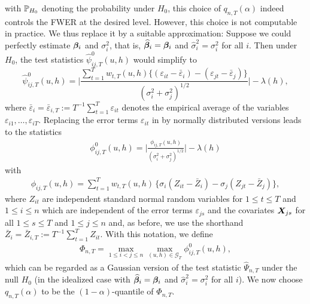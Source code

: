 \documentclass[a4paper,12pt]{article}
\makeatletter
\renewcommand{\eqref}[1]{\tagform@{\ref{#1}}}
\makeatother
\begin{document}
with $\mathbb{P}_{H_0}$ denoting the probability under $H_0$, this choice of $q_{n,T}(\alpha)$ indeed controls the FWER at the desired level. However, this choice is not computable in practice. We thus replace it by a suitable approximation: Suppose we could perfectly estimate $\bm{\beta}_i$ and $\sigma_i^2$, that is, $\widehat{\bm{\beta}}_i = \bm{\beta}_i$ and $\widehat{\sigma}_i^2 = \sigma_i^2$ for all $i$. Then under $H_0$, the test statistics $\widehat{\psi}^0_{ij, T}(u, h)$ would simplify to 
\begin{equation}\label{eq:stat-idealized}
\widehat{\psi}^0_{ij, T}(u, h) = \Big| \frac{\sum\nolimits_{t=1}^T w_{t,T}(u, h) \{ (\varepsilon_{it} - \bar{\varepsilon}_i) - (\varepsilon_{jt} - \bar{\varepsilon}_j) \}}{(\sigma_i^2 + \sigma_j^2)^{1/2}} \Big| - \lambda(h), 
\end{equation}
where $\bar{\varepsilon}_i = \bar{\varepsilon}_{i,T} := T^{-1} \sum_{t=1}^T \varepsilon_{it}$ denotes the empirical average of the variables $\varepsilon_{i1},\ldots,\varepsilon_{iT}$. Replacing the error terms $\varepsilon_{it}$ in \eqref{eq:stat-idealized} by normally distributed versions leads to the statistics
\begin{align}\label{eq:phi_zero_ij}
\phi^0_{ij, T}(u, h) =  \bigg|\frac{\phi_{ij, T}(u, h)}{(\sigma_i^2 + \sigma_j^2)^{1/2}}\bigg| - \lambda(h)
\end{align}
with 
\begin{align}\label{eq:phi_ij}
\phi_{ij, T}(u, h) = \sum\limits_{t=1}^T w_{t,T}(u, h) \, \big\{ \sigma_i (Z_{it} - \bar{Z}_i) - \sigma_j (Z_{jt} - \bar{Z}_j) \big\},
\end{align}
where $Z_{it}$ are independent standard normal random variables for $1 \le t \le T$ and $1 \le i \le n$ which are independent of the error terms $\varepsilon_{js}$ and the covariates $\boldsymbol{X}_{js}$ for all $1 \leq s \leq T $ and $1 \leq j \leq n$ and, as before, we use the shorthand $\bar{Z}_i = \bar{Z}_{i,T} := T^{-1} \sum_{t=1}^T Z_{it}$. With this notation, we define 
\begin{align}\label{eq:Phi}
\Phi_{n,T} = \max_{1 \le i < j \le n}\max_{(u, h) \in \mathcal{G}_T} \phi^0_{ij, T}(u, h),
\end{align}
which can be regarded as a Gaussian version of the test statistic $\widehat{\Psi}_{n,T}$ under the null $H_0$ (in the idealized case with $\widehat{\bm{\beta}}_i = \bm{\beta}_i$ and $\widehat{\sigma}_i^2 = \sigma_i^2$ for all $i$). We now choose $q_{n,T}(\alpha)$ to be the $(1-\alpha)$-quantile of $\Phi_{n,T}$. 
\end{document}
